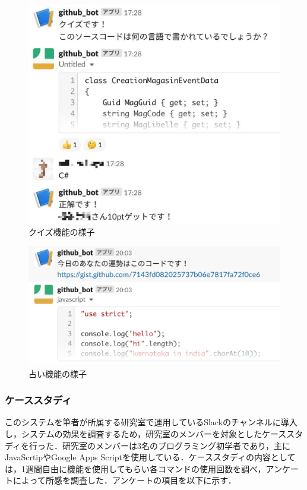 \begin{figure}[htb]
  \begin{center}
    \includegraphics[width=0.4\linewidth]{image/prototype_quiz.eps}
  \end{center}
    \vspace{-8mm} 
  \caption{クイズ機能の様子}
  \label{prototype_quiz}
\end{figure}

\begin{figure}[htb]
  \begin{center}
    \includegraphics[width=0.6\linewidth]{image/prototype_fortune.eps}
  \end{center}
    \vspace{-8mm} 
  \caption{占い機能の様子}
  \label{prototype_fortune}
\end{figure}

\vspace{120truept}
\subsubsection{ケーススタディ}
このシステムを筆者が所属する研究室で運用しているSlackのチャンネルに導入し，システムの効果を調査するため，研究室のメンバーを対象としたケーススタディを行った．研究室のメンバーは3名のプログラミング初学者であり，主にJavaScrtipやGoogle Apps Scriptを使用している．ケーススタディの内容としては，1週間自由に機能を使用してもらい各コマンドの使用回数を調べ，アンケートによって所感を調査した．アンケートの項目を以下に示す．

